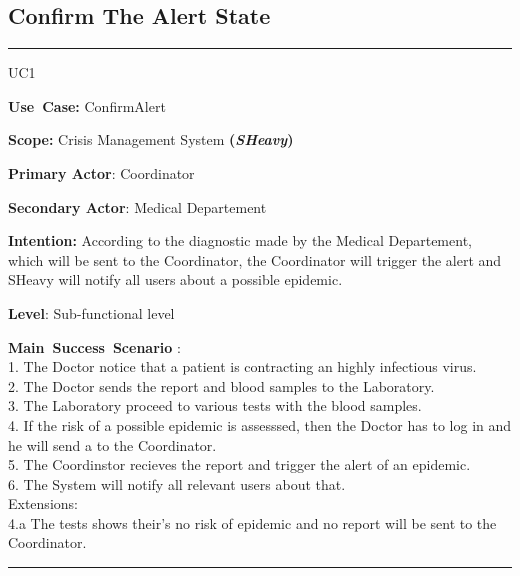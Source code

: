 \subsection{Confirm The Alert State}
\vspace{0.5cm}
\hrule
\vspace{0.5cm}
\begin{lyxlist}{UC1}
\small{
\item [\textbf{Use~Case:}] ConfirmAlert
\item [\textbf{Scope:}] Crisis Management System \textbf{(\emph{SHeavy})}
\item [\textbf{Primary Actor}:] Coordinator
\item [\textbf{Secondary Actor}:] Medical Departement
\item [\textbf{Intention:}] According to the diagnostic made by the Medical
Departement, which will be sent to the Coordinator, the Coordinator will trigger
the alert and SHeavy will notify all users about a possible epidemic.
\item [\textbf{Level}:]Sub-functional level
\item [\textbf{Main~Success~Scenario}]:\\
1. The Doctor notice that a patient is contracting an highly infectious virus.\\
2. The Doctor sends the report and blood samples to the Laboratory.\\
3. The Laboratory proceed to various tests with the blood samples.\\
4. If the risk of a possible epidemic is assesssed, then the Doctor has to log
in and he will send a to the Coordinator.\\
5. The Coordinstor recieves the report and trigger the alert of an epidemic.\\
6. The System will notify all relevant users about that.\\
Extensions:\\
	4.a The tests shows their's no risk of epidemic and no report will be sent to
the Coordinator.\\
}
\end{lyxlist}
\hrule 
\vspace{0.5cm} 

